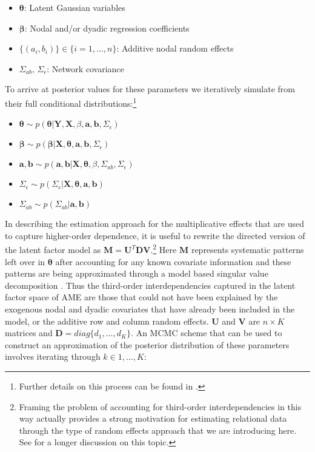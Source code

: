 \begin{itemize}
	\item $\bm\theta$: Latent Gaussian variables
	\item $\bm\beta$: Nodal and/or dyadic regression coefficients
	\item $\{(a_{i},b_{i})\} \in \{i=1, \ldots, n \}$: Additive nodal random effects
	\item $\Sigma_{ab},\, \Sigma_{\epsilon}$: Network covariance
\end{itemize}

To arrive at posterior values for these parameters we iteratively simulate from their full conditional distributions:\footnote{Further details on this process can be found in \citet{hoff:2005}.}

\begin{itemize}
	\item $\bm\theta \sim p(\bm\theta | \mathbf{Y}, \mathbf{X}, \beta, \mathbf{a}, \mathbf{b}, \Sigma_{\epsilon})$	
	\item $\bm\beta \sim p(\bm\beta | \mathbf{X}, \bm\theta, \mathbf{a}, \mathbf{b}, \Sigma_{\epsilon})$
	\item $\mathbf{a}, \mathbf{b} \sim p(\mathbf{a}, \mathbf{b} | \mathbf{X}, \bm\theta, \beta, \Sigma_{ab}, \Sigma_{\epsilon})$
	\item $\Sigma_{\epsilon} \sim p(\Sigma_{\epsilon} | \mathbf{X}, \bm\theta, \mathbf{a}, \mathbf{b})$
	\item $\Sigma_{ab} \sim p(\Sigma_{ab} | \mathbf{a}, \mathbf{b})$
\end{itemize}

In describing the estimation approach for the multiplicative effects that are used to capture higher-order dependence, it is useful to rewrite the directed version of the latent factor model as $\mathbf{M} = \mathbf{U}^{T} \mathbf{D} \mathbf{V}$.\footnote{Framing the problem of accounting for third-order interdependencies in this way actually provides a strong motivation for estimating relational data through the type of random effects approach that we are introducing here. See \citet{hoff:2009} for a longer discussion on this topic.} Here $\mathbf{M}$ represents systematic patterns left over in $\bm\theta$ after accounting for any known covariate information and these patterns are being approximated through a model based singular value decomposition \citep{hoff:2009}. Thus the third-order interdependencies captured in the latent factor space of AME are those that could not have been explained by the exogenous nodal and dyadic covariates that have already been included in the model, or the additive row and column random effects. $\mathbf{U}$ and $\mathbf{V}$ are $n \times K$ matrices and $\mathbf{D}=diag\{d_{1}, \ldots, d_{K}\}$. An MCMC scheme that can be used to construct an approximation of the posterior distribution of these parameters involves iterating through $k \in 1, \ldots, K$:

